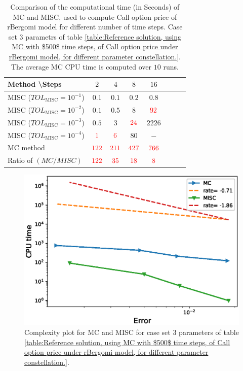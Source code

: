 \FloatBarrier
\begin{table}[h!]
	\centering
	\begin{tabular}{l*{6}{c}r}
		Method \textbackslash  Steps            & $2$ & $4$ & $8$ & $16$ &   \\
		\hline
		MISC ($TOL_{\text{MISC}}=10^{-1}$)  & $0.1$ & $0.1$ & $0.2$ & $0.8$ \\
		MISC ($TOL_{\text{MISC}}=10^{-2}$)  & $0.1$ & $0.5$ & $8$ & $\red{92}$ \\
		MISC ($TOL_{\text{MISC}}=10^{-3}$)  & $0.5$ & $3$ & $\red{24}$ & $2226$ \\
		MISC ($TOL_{\text{MISC}}=10^{-4}$)  & $\red{1}$ & $\red{6}$ & $80$ & $-$\\
		\hline
		MC method   & $ \red{122}
		
		$  & $  \red{211}$  & $  \red{427}$ & $ \red{766}
		$  \\	
		\hline
		Ratio of $\left(MC/MISC \right)$ & $ \red{122}
		
		$  & $  \red{35}$  & $  \red{  18
		}$ & $ \red{ 8}
		$  \\	
		
		\hline
	\end{tabular}
	\caption{Comparison of the computational time (in Seconds) of  MC and MISC, used to compute Call option price of rBergomi model for different number of time steps. Case set $3$ parametrs of table \ref{table:Reference solution, using MC with $500$ time steps, of Call option price under rBergomi model, for different parameter constellation.}. The average  MC CPU time is computed over $10$ runs. }
	\label{Comparsion of the computational time of  MC and MISC, used to compute Call option price of rBergomi model for different number of time steps. Case set3}
\end{table}
\FloatBarrier
	\begin{figure}[h!]
	\centering
	\includegraphics[width=0.4\linewidth]{./figures/rBergomi_Complexity_rates/set5/error_vs_time_set5}

	\caption{Complexity plot for   MC and MISC for case set $3$ parameters of table \ref{table:Reference solution, using MC with $500$ time steps, of Call option price under rBergomi model, for different parameter constellation.}.}
	\label{fig:Complexity plot for MC and MISC for Case set $3$ parameters}
\end{figure}



